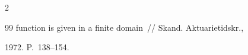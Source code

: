 \begin{multicols}{2}
{{\begin{thebibliography}{99}
function is given in a finite domain~// Skand. Aktuarietidskr.,


1972. P.~138--154.































 \end{thebibliography}


}


}


\end{multicols}


